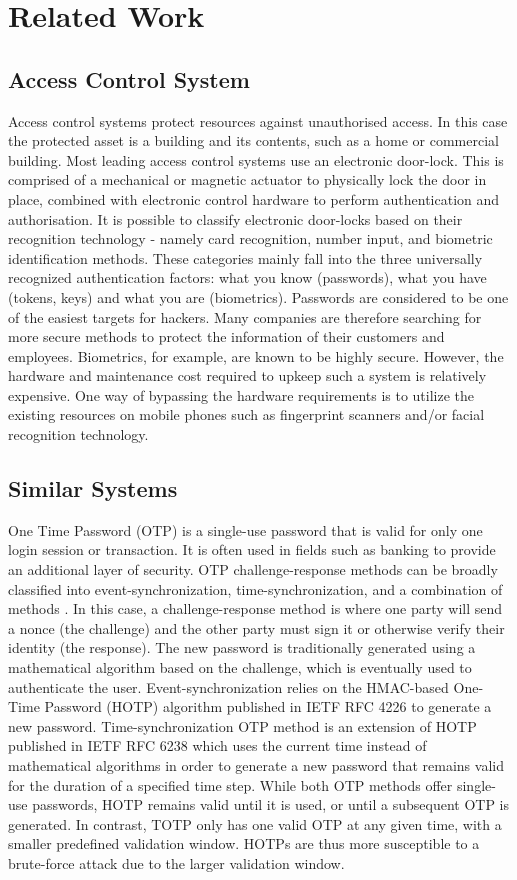 \documentclass[conference]{IEEEtran}
\begin{document}
\section{Related Work}
\subsection{Access Control System}
	Access control systems protect resources against unauthorised access. In this case the protected asset is a building and its contents, such as a home or commercial building. Most leading access control systems use an electronic door-lock. This is comprised of a mechanical or magnetic actuator to physically lock the door in place, combined with electronic control hardware to perform authentication and authorisation.    It is possible to classify electronic door-locks based on their recognition technology - namely card recognition, number input, and biometric identification methods. These categories mainly fall into the three universally recognized authentication factors: what you know (passwords), what you have (tokens, keys) and what you are (biometrics). 
Passwords are considered to be one of the easiest targets for hackers. Many companies are therefore searching for more secure methods to protect the information of their customers and employees. Biometrics, for example, are known to be highly secure. However, the hardware and maintenance cost required to upkeep such a system is relatively expensive. One way of bypassing the hardware requirements is to utilize the existing resources on mobile phones such as fingerprint scanners and/or facial recognition technology.

\subsection{Similar Systems}
	One Time Password (OTP) is a single-use password that is valid for only one login session or transaction. It is often used in fields such as banking to provide an additional layer of security. OTP challenge-response methods can be broadly classified into event-synchronization, time-synchronization, and a combination of methods \cite{ab4} \cite{ab5}. In this case, a challenge-response method is where one party will send a nonce (the challenge) and the other party must sign it or otherwise verify their identity (the response). The new password is traditionally generated using a mathematical algorithm based on the challenge, which is eventually used to authenticate the user. Event-synchronization  relies on the HMAC-based One-Time Password (HOTP) algorithm published in IETF RFC 4226 \cite{ab6} to generate a new password. Time-synchronization OTP method is an extension of HOTP published in IETF RFC 6238 \cite{ab7} which uses the current time instead of mathematical algorithms in order to generate a new password that remains valid for the duration of a specified time step. While both OTP methods offer single-use passwords, HOTP remains valid until it is used, or until a subsequent OTP is generated. In contrast, TOTP only has one valid OTP at any given time, with a smaller predefined validation window. HOTPs are thus more susceptible to a brute-force attack due to the larger validation window.
	
\end{document}

